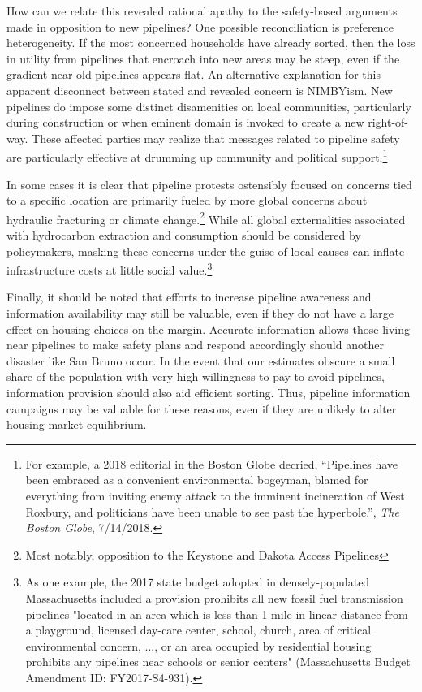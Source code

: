 \documentclass[12pt]{article}
\begin{document}
How can we relate this revealed rational apathy to the safety-based arguments made in opposition to new pipelines? One possible reconciliation is preference heterogeneity. If the most concerned households have already sorted, then the loss in utility from pipelines that encroach into new areas may be steep, even if the gradient near old pipelines appears flat. An alternative explanation for this apparent disconnect between stated and revealed concern is NIMBYism. New pipelines do impose some distinct disamenities on local communities, particularly during construction or when eminent domain is invoked to create a new right-of-way. These affected parties may realize that messages related to pipeline safety are particularly effective at drumming up community and political support.\footnote{For example, a 2018 editorial in the Boston Globe decried, ``Pipelines have been embraced as a convenient environmental bogeyman, blamed for everything from inviting enemy attack to the imminent incineration of West Roxbury, and politicians have been unable to see past the hyperbole.'', \textit{The Boston Globe}, 7/14/2018.}

In some cases it is clear that pipeline protests ostensibly focused on concerns tied to a specific location are primarily fueled by more global concerns about hydraulic fracturing or climate change.\footnote{Most notably, opposition to the Keystone and Dakota Access Pipelines} While all global externalities associated with hydrocarbon extraction and consumption should be considered by policymakers, masking these concerns under the guise of local causes can inflate infrastructure costs at little social value.\footnote{As one example, the 2017 state budget adopted in densely-populated Massachusetts included a provision prohibits all new fossil fuel transmission pipelines "located in an area which is less than 1 mile in linear distance from a playground, licensed day-care center, school, church, area of critical environmental concern, ..., or an area occupied by residential housing prohibits any pipelines near schools or senior centers" (Massachusetts Budget Amendment ID: FY2017-S4-931).} 

Finally, it should be noted that efforts to increase pipeline awareness and information availability may still be valuable, even if they do not have a large effect on housing choices on the margin. Accurate information allows those living near pipelines to make safety plans and respond accordingly should another disaster like San Bruno occur. In the event that our estimates obscure a small share of the population with very high willingness to pay to avoid pipelines, information provision should also aid efficient sorting.  Thus, pipeline information campaigns may be valuable for these reasons, even if they are unlikely to alter housing market equilibrium. 
\end{document}
